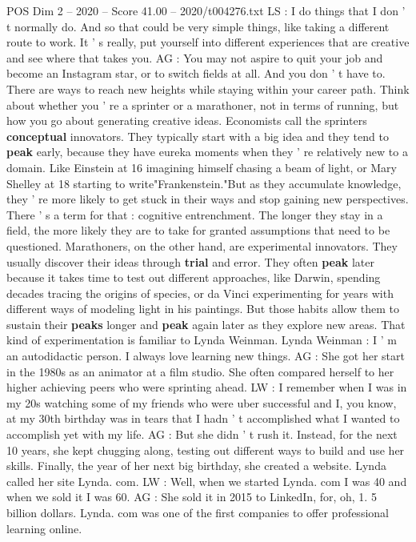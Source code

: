 \begin{textsample}{POS Dim 2 – 2020 – Score 41.00 – 2020/t004276.txt}
LS : I do things that I don ' t normally do.
And so that could be very simple things, like taking a different route to work.
It ' s really, put yourself into different experiences that are creative and see where that takes you.
AG : You may not aspire to quit your job and become an Instagram star, or to switch fields at all.
And you don ' t have to.
There are ways to reach new heights while staying within your career path.
Think about whether you ' re a sprinter or a marathoner, not in terms of running, but how you go about generating creative ideas.
Economists call the sprinters \textbf{conceptual} innovators.
They typically start with a big idea and they tend to \textbf{peak} early, because they have eureka moments when they ' re relatively new to a domain.
Like Einstein at 16 imagining himself chasing a beam of light, or Mary Shelley at 18 starting to write"Frankenstein."But as they accumulate knowledge, they ' re more likely to get stuck in their ways and stop gaining new perspectives.
There ' s a term for that : cognitive entrenchment.
The longer they stay in a field, the more likely they are to take for granted assumptions that need to be questioned.
Marathoners, on the other hand, are experimental innovators.
They usually discover their ideas through \textbf{trial} and error.
They often \textbf{peak} later because it takes time to test out different approaches, like Darwin, spending decades tracing the origins of species, or da Vinci experimenting for years with different ways of modeling light in his paintings.
But those habits allow them to sustain their \textbf{peaks} longer and \textbf{peak} again later as they explore new areas.
That kind of experimentation is familiar to Lynda Weinman.
Lynda Weinman : I ' m an autodidactic person.
I always love learning new things.
AG : She got her start in the 1980s as an animator at a film studio.
She often compared herself to her higher achieving peers who were sprinting ahead.
LW : I remember when I was in my 20s watching some of my friends who were uber successful and I, you know, at my 30th birthday was in tears that I hadn ' t accomplished what I wanted to accomplish yet with my life.
AG : But she didn ' t rush it.
Instead, for the next 10 years, she kept chugging along, testing out different ways to build and use her skills.
Finally, the year of her next big birthday, she created a website.
Lynda called her site Lynda. com.
LW : Well, when we started Lynda. com I was 40 and when we sold it I was 60.
AG : She sold it in 2015 to LinkedIn, for, oh, 1. 5 billion dollars.
Lynda. com was one of the first companies to offer professional learning online.

\end{textsample}
